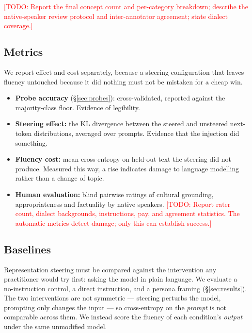 \documentclass[11pt,a4paper]{article}
\newcommand{\todo}[1]{\textcolor{red}{[TODO: #1]}}
\begin{document}
\todo{Report the final concept count and per-category breakdown; describe the
native-speaker review protocol and inter-annotator agreement; state dialect
coverage.}

\subsection{Metrics}
\label{sec:metrics}
We report effect and cost separately, because a steering configuration that
leaves fluency untouched because it did nothing must not be mistaken for a
cheap win.

\begin{itemize}
  \item \textbf{Probe accuracy} (\S\ref{sec:probes}): cross-validated, reported
        against the majority-class floor. Evidence of legibility.
  \item \textbf{Steering effect:} the KL divergence between the steered and
        unsteered next-token distributions, averaged over prompts. Evidence
        that the injection did something.
  \item \textbf{Fluency cost:} mean cross-entropy on held-out text the steering
        did not produce. Measured this way, a rise indicates damage to language
        modelling rather than a change of topic.
  \item \textbf{Human evaluation:} blind pairwise ratings of cultural
        grounding, appropriateness and factuality by native speakers.
        \todo{Report rater count, dialect backgrounds, instructions, pay, and
        agreement statistics. The automatic metrics detect damage; only this
        can establish success.}
\end{itemize}

\subsection{Baselines}
\label{sec:baselines}
Representation steering must be compared against the intervention any
practitioner would try first: asking the model in plain language. We evaluate a
no-instruction control, a direct instruction, and a persona framing
(\S\ref{sec:results}). The two interventions are not symmetric --- steering
perturbs the model, prompting only changes the input --- so cross-entropy on the
\emph{prompt} is not comparable across them. We instead score the fluency of
each condition's \emph{output} under the same unmodified model.

\end{document}
